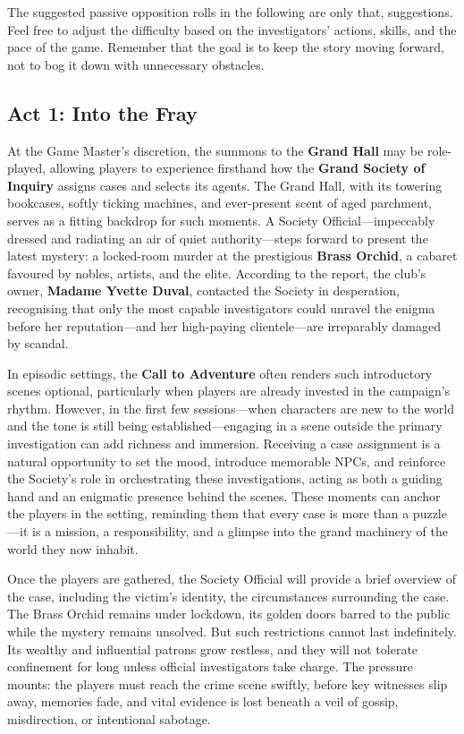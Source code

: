 \begin{GmTips}
	The suggested passive opposition rolls in the following are only that, suggestions. Feel free to adjust the difficulty based on the investigators' actions, skills, and the pace of the game. Remember that the goal is to keep the story moving forward, not to bog it down with unnecessary obstacles.
\end{GmTips}
\newcolumn


\subsection{Act 1: Into the Fray}

At the Game Master’s discretion, the summons to the \textbf{Grand Hall} may be role-played, allowing players to experience firsthand how the \textbf{Grand Society of Inquiry} assigns cases and selects its agents. The Grand Hall, with its towering bookcases, softly ticking machines, and ever-present scent of aged parchment, serves as a fitting backdrop for such moments. A Society Official—impeccably dressed and radiating an air of quiet authority—steps forward to present the latest mystery: a locked-room murder at the prestigious \textbf{Brass Orchid}, a cabaret favoured by nobles, artists, and the elite. According to the report, the club’s owner, \textbf{Madame Yvette Duval}, contacted the Society in desperation, recognising that only the most capable investigators could unravel the enigma before her reputation—and her high-paying clientele—are irreparably damaged by scandal.

In episodic settings, the \textbf{Call to Adventure} often renders such introductory scenes optional, particularly when players are already invested in the campaign’s rhythm. However, in the first few sessions—when characters are new to the world and the tone is still being established—engaging in a scene outside the primary investigation can add richness and immersion. Receiving a case assignment is a natural opportunity to set the mood, introduce memorable NPCs, and reinforce the Society’s role in orchestrating these investigations, acting as both a guiding hand and an enigmatic presence behind the scenes. These moments can anchor the players in the setting, reminding them that every case is more than a puzzle—it is a mission, a responsibility, and a glimpse into the grand machinery of the world they now inhabit.

Once the players are gathered, the Society Official will provide a brief overview of the case, including the victim's identity, the circumstances surrounding the case. The Brass Orchid remains under lockdown, its golden doors barred to the public while the mystery remains unsolved. But such restrictions cannot last indefinitely. Its wealthy and influential patrons grow restless, and they will not tolerate confinement for long unless official investigators take charge. The pressure mounts: the players must reach the crime scene swiftly, before key witnesses slip away, memories fade, and vital evidence is lost beneath a veil of gossip, misdirection, or intentional sabotage.


